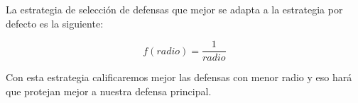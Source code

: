 La estrategia de selección de defensas que mejor se adapta a la estrategia por defecto es la siguiente:

$$ f(radio)=\frac{1}{radio} $$

Con esta estrategia calificaremos mejor las defensas con menor radio y eso hará que protejan mejor a nuestra defensa principal.